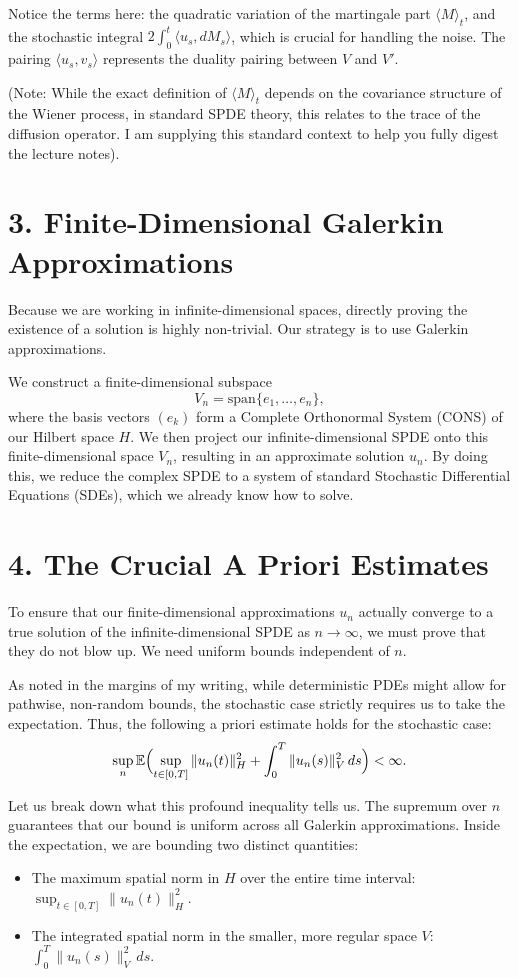 \documentclass[11pt]{article}
\theoremstyle{definition}
\theoremstyle{remark}
\begin{document}
Notice the terms here: the quadratic variation of the martingale part $\langle M \rangle_t$, and the stochastic integral $2\int_0^t \langle u_s, dM_s \rangle$, which is crucial for handling the noise. The pairing $\langle u_s, v_s \rangle$ represents the duality pairing between $V$ and $V'$.

(Note: While the exact definition of $\langle M \rangle_t$ depends on the covariance structure of the Wiener process, in standard SPDE theory, this relates to the trace of the diffusion operator. I am supplying this standard context to help you fully digest the lecture notes).

\section*{3. Finite-Dimensional Galerkin Approximations}
Because we are working in infinite-dimensional spaces, directly proving the existence of a solution is highly non-trivial. Our strategy is to use Galerkin approximations.

We construct a finite-dimensional subspace
\[
  V_n = \mathrm{span}\{e_1,\dots,e_n\},
\]
where the basis vectors $(e_k)$ form a Complete Orthonormal System (CONS) of our Hilbert space $H$. We then project our infinite-dimensional SPDE onto this finite-dimensional space $V_n$, resulting in an approximate solution $u_n$. By doing this, we reduce the complex SPDE to a system of standard Stochastic Differential Equations (SDEs), which we already know how to solve.

\section*{4. The Crucial A Priori Estimates}
To ensure that our finite-dimensional approximations $u_n$ actually converge to a true solution of the infinite-dimensional SPDE as $n \to \infty$, we must prove that they do not blow up. We need uniform bounds independent of $n$.

As noted in the margins of my writing, while deterministic PDEs might allow for pathwise, non-random bounds, the stochastic case strictly requires us to take the expectation. Thus, the following a priori estimate holds for the stochastic case:
\[
  \sup_n \mathbb{E}\Bigl(\sup_{t\in[0,T]} \|u_n(t)\|_H^2 + \int_0^T \|u_n(s)\|_V^2\,ds\Bigr) < \infty.
\]

Let us break down what this profound inequality tells us. The supremum over $n$ guarantees that our bound is uniform across all Galerkin approximations. Inside the expectation, we are bounding two distinct quantities:
\begin{itemize}
\item The maximum spatial norm in $H$ over the entire time interval: $\sup_{t\in[0,T]} \|u_n(t)\|_H^2$.
\item The integrated spatial norm in the smaller, more regular space $V$: $\int_0^T \|u_n(s)\|_V^2\,ds$.
\end{itemize}
\end{document}
